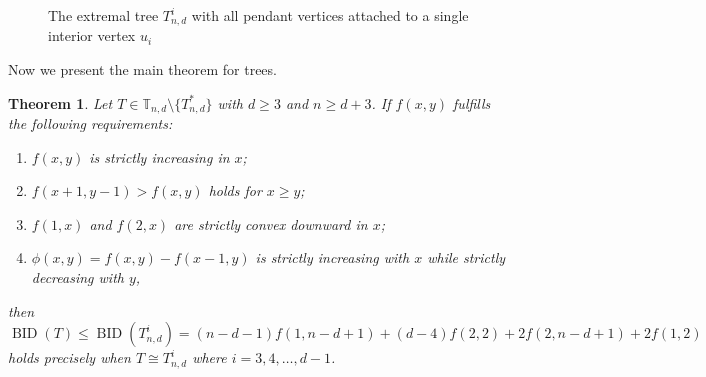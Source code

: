 \documentclass[12pt]{article}
\newtheorem{theorem}{Theorem}[section]
\theoremstyle{definition}
\newcommand{\BID}{\operatorname{BID}}
\newcommand{\TT}{\mathbb{T}}
\begin{document}
\begin{figure}[h]
\centering
{}
\caption{The extremal tree \(T_{n,d}^i\) with all pendant vertices attached to a single interior vertex \(u_i\)}
\label{fig:Tn_d}
\end{figure}

Now we present the main theorem for trees.

\begin{theorem}
\label{thm:trees}
Let \(T \in \TT_{n,d}\setminus\{T_{n,d}^*\}\) with \(d \geq 3\) and \(n \geq d+3\). If \(f(x,y)\) fulfills the following requirements:
\begin{enumerate}[label=(\roman*)]
\item \(f(x,y)\) is strictly increasing in \(x\);
\item \(f(x+1,y-1) > f(x,y)\) holds for \(x \geq y\);
\item \(f(1,x)\) and \(f(2,x)\) are strictly convex downward in \(x\);
\item \(\phi(x,y) = f(x,y) - f(x-1,y)\) is strictly increasing with \(x\) while strictly decreasing with \(y\),
\end{enumerate}
then
\begin{equation}
\BID(T) \leq \BID(T_{n,d}^i) = (n-d-1)f(1,n-d+1) + (d-4)f(2,2) + 2f(2,n-d+1) + 2f(1,2)
\end{equation}
holds precisely when \(T \cong T_{n,d}^i\) where \(i = 3,4,\ldots,d-1\).
\end{theorem}
\end{document}
